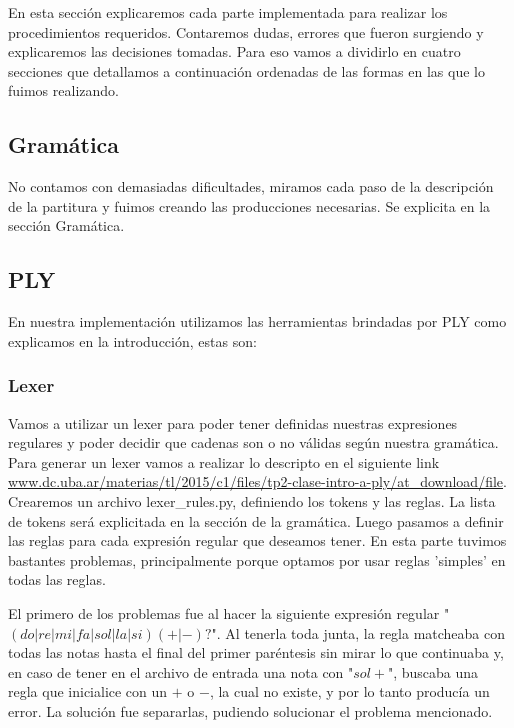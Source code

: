 En esta sección explicaremos cada parte implementada para realizar los procedimientos requeridos. Contaremos dudas, errores que fueron surgiendo y explicaremos las decisiones tomadas. Para eso vamos a dividirlo en cuatro secciones que detallamos a continuación ordenadas de las formas en las que lo fuimos realizando.

\subsection{Gramática}
No contamos con demasiadas dificultades, miramos cada paso de la descripción de la partitura y fuimos creando las producciones necesarias. Se explicita en la sección Gramática.

\subsection{PLY}
En nuestra implementación utilizamos las herramientas brindadas por PLY como explicamos en la introducción, estas son:
\subsubsection{Lexer}
Vamos a utilizar un lexer para poder tener definidas nuestras expresiones regulares y poder decidir que cadenas son o no válidas según nuestra gramática.
Para generar un lexer vamos a realizar lo descripto en el siguiente link \url{www.dc.uba.ar/materias/tl/2015/c1/files/tp2-clase-intro-a-ply/at_download/file}.
Crearemos un archivo lexer\_rules.py, definiendo los tokens y las reglas.
La lista de tokens será explicitada en la sección de la gramática.\newline
Luego pasamos a definir las reglas para cada expresión regular que deseamos tener. En esta parte tuvimos bastantes problemas, principalmente porque optamos por usar reglas 'simples' en todas las reglas.\newline

El primero de los problemas fue al hacer la siguiente expresión regular "$(do|re|mi|fa|sol|la|si)(+|-)?$". Al tenerla toda junta, la regla matcheaba con todas las notas hasta el final del primer paréntesis sin mirar lo que continuaba y, en caso de tener en el archivo de entrada una nota con "$sol+$", buscaba una regla que inicialice con un $+$ o $-$, la cual no existe, y por lo tanto producía un error. La solución fue separarlas, pudiendo solucionar el problema mencionado. \newline

